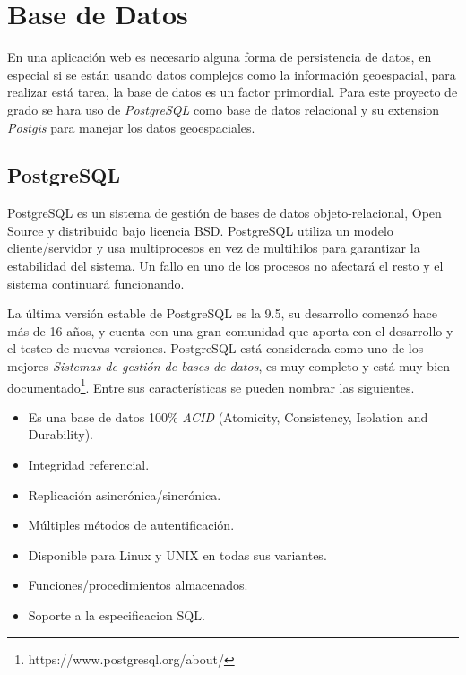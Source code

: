
  \section{Base de Datos} %
  \label{chap:base_de_datos}

  En una aplicación web es necesario alguna forma de persistencia de datos, en especial si se están usando datos complejos como la información geoespacial, para realizar está tarea, la base de datos es un factor primordial.  Para este proyecto de grado se hara uso de \emph{PostgreSQL} como base de datos relacional y su extension \emph{Postgis} para manejar los datos geoespaciales.\\

    \subsection{PostgreSQL} %
    \label{sec:postgres}

      PostgreSQL es un sistema de gestión de bases de datos objeto-relacional, Open Source y distribuido bajo licencia BSD.
      PostgreSQL utiliza un modelo cliente/servidor y usa multiprocesos en vez de multihilos para garantizar la estabilidad del sistema. Un fallo en uno de los procesos no afectará el resto y el sistema continuará funcionando.

      La última versión estable de PostgreSQL es la 9.5, su desarrollo comenz\'o hace más de 16 años, y cuenta con una gran comunidad que aporta con el desarrollo y el testeo de nuevas versiones.
      PostgreSQL  está considerada como uno de los mejores \emph{Sistemas de gesti\'on de bases de datos}, es muy completo y está muy bien documentado\footnote{https://www.postgresql.org/about/}.
      Entre sus características se pueden nombrar las siguientes.
      \begin{itemize}
        \item Es una base de datos 100\% \emph{ACID} (Atomicity, Consistency, Isolation and Durability).
        \item Integridad referencial.
        \item Replicación asincrónica/sincrónica.
        \item Múltiples métodos de autentificación.
        \item Disponible para Linux y UNIX en todas sus variantes.
        \item Funciones/procedimientos almacenados.
        \item Soporte a la especificacion SQL.
      \end{itemize}

